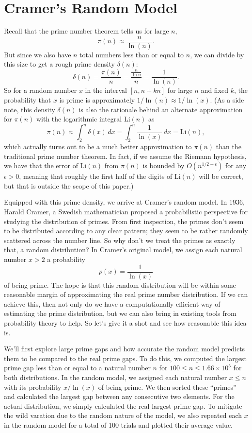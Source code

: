 \documentclass[conference]{IEEEtran}
\begin{document}
\section{Cramer's Random Model}
Recall that the prime number theorem tells us for
large $n$,
\[\pi(n) \approx \frac{n}{\ln(n)}.\]
But since we also have $n$ total numbers less than or equal to
$n$, we can divide by this size to get a rough prime density
$\delta(n)$:
\[\delta(n) = \frac{\pi(n)}{n} = \frac{\frac{n}{\ln{n}}}{n} = \frac{1}{\ln(n)}.\]
So for a random number $x$ in the interval $[n, n + kn]$ for
large $n$ and fixed $k$, the probability that $x$ is prime is
approximately $1 / \ln(n) \approx 1 / \ln(x)$. (As a side note, this
density $\delta(n)$ is also the rationale behind an alternate
approximation for $\pi(n)$ with the logarithmic integral
$\text{Li}(n)$ as
\[\pi(n) \approx \int_2^{n} \delta(x)\, dx = \int_2^{n} \frac{1}{\ln(x)}\, dx = \text{Li}(n),\]
which actually turns out to be a much better approximation to
$\pi(n)$ than the traditional prime number theorem. In
fact, if we assume the
Riemann hypothesis, we have that the error of $\text{Li}(n)$ from
$\pi(n)$ is bounded by $O(n^{1/2 + \epsilon})$ for any
$\epsilon > 0$, meaning that roughly the first half of the
digits of
$\text{Li}(n)$ will be correct,
but that is outside the scope of this paper.)

Equipped with this prime density, we arrive at
Cramer's random model. In 1936, Harald Cramer, a Swedish mathematician
proposed a probabilistic perspective for studying
the distribution of primes. From first inspection,
the primes don't seem to be distributed according to
any clear pattern; they seem to be rather randomly
scattered across the number line. So why don't
we treat the primes as exactly that, a random distribution?
In Cramer's original model, we assign each natural number
$x > 2$ a probability
\[p(x) = \frac{1}{\ln(x)}\]
of being prime.
The hope is that this random distribution will be within
some reasonable margin of approximating the real prime
number distribution. If we can achieve this, then not only
do we have a computationally efficient way of
estimating the prime distribution, but we can also bring
in existing tools from probability theory to help. So
let's give it a shot and see how reasonable this idea is.

We'll first explore large prime gaps and how accurate the
random model predicts them to be compared to the real
prime gaps. To do this, we computed the largest prime gap
less than or equal to a natural number $n$ for
$100 \le n \le 1.66 \times 10^5$ for both distributions.
In the random model, we assigned each natural number $x \le n$
with its probability $x/\ln(x)$ of being prime. We then sorted
these ``primes'' and calculated the largest gap between
any consecutive two elements. For the actual distribution, we
simply calculated the real largest prime gap. To mitigate the wild
varation due to the random nature of the model, we also repeated
each $x$ in the random model for a total of 100 trials and
plotted their average value.
\end{document}
